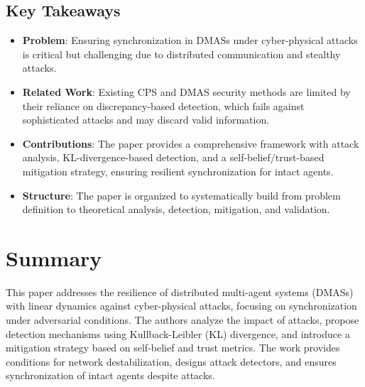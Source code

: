 \documentclass{article}
\begin{document}
\subsection*{Key Takeaways}
\begin{itemize}
    \item \textbf{Problem}: Ensuring synchronization in DMASs under cyber-physical attacks is critical but challenging due to distributed communication and stealthy attacks.
    \item \textbf{Related Work}: Existing CPS and DMAS security methods are limited by their reliance on discrepancy-based detection, which fails against sophisticated attacks and may discard valid information.
    \item \textbf{Contributions}: The paper provides a comprehensive framework with attack analysis, KL-divergence-based detection, and a self-belief/trust-based mitigation strategy, ensuring resilient synchronization for intact agents.
    \item \textbf{Structure}: The paper is organized to systematically build from problem definition to theoretical analysis, detection, mitigation, and validation.
\end{itemize}


\section*{Summary}
This paper addresses the resilience of distributed multi-agent systems (DMASs) with linear dynamics against cyber-physical attacks, focusing on synchronization under adversarial conditions. The authors analyze the impact of attacks, propose detection mechanisms using Kullback-Leibler (KL) divergence, and introduce a mitigation strategy based on self-belief and trust metrics. The work provides conditions for network destabilization, designs attack detectors, and ensures synchronization of intact agents despite attacks.
\end{document}
